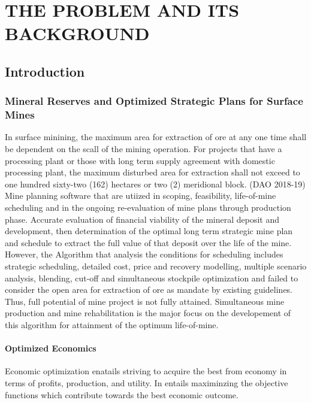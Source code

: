 \documentclass[12pt]{report}
\begin{document}
\chapter{THE PROBLEM AND ITS BACKGROUND}


\section{Introduction}

\subsection{Mineral Reserves and Optimized Strategic Plans for Surface Mines}

In surface minining, the maximum area for extraction of ore at any one time shall be dependent on the scall of the mining operation.
For projects that have a processing plant or those with long term supply agreement with domestic processing plant, the maximum disturbed area for extraction shall not exceed to one hundred sixty-two (162) hectares or two (2) meridional block. (DAO 2018-19)
Mine planning software that are utiized in scoping, feasibility, life-of-mine scheduling and in the ongoing re-evaluation of mine plans through production phase.
Accurate evaluation of financial viability of the mineral deposit and development, then determination of the optimal long term strategic mine plan and schedule to extract the full value of that deposit over the life of the mine. 
However, the Algorithm that analysis the conditions for scheduling includes strategic scheduling, detailed cost, price and recovery modelling, multiple scenario analysis, blending, cut-off and simultaneous stockpile optimization and failed to consider the open area for extraction of ore as mandate by existing guidelines. 
Thus, full potential of mine project is not fully attained.
Simultaneous mine production and mine rehabilitation is the major focus on the developement of this algorithm for attainment of the optimum life-of-mine.

\subsubsection{Optimized Economics}
Economic optimization enatails striving to acquire the best from economy in terms of profits, production, and utility.
In entails maximinzing the objective functions which contribute towards the best economic outcome.
\end{document}
